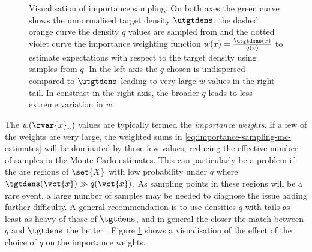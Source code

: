 \begin{figure}[t]
\begin{subfigure}[b]{.48\linewidth}
\end{subfigure}
\caption[Visualisation of importance sampling.]{Visualisation of importance sampling. On both axes the green curve shows the unnormalised target density $\utgtdens$, the dashed orange curve the density $q$ values are sampled from and the dotted violet curve the importance weighting function $w(x) = \frac{\utgtdens(x)}{q(x)}$ to estimate expectations with respect to the target density using samples from $q$. In the left axis the $q$ chosen is undispersed compared to $\utgtdens$ leading to very large $w$ values in the right tail. In constrast in the right axis, the broader $q$ leads to less extreme variation in $w$.}
\label{fig:importance-sampling}
\end{figure}

The $w(\rvar{x}_n)$ values are typically termed the \emph{importance weights}. If a few of the weights are very large, the weighted sums in \eqref{eq:importance-sampling-mc-estimates} will be dominated by those few values, reducing the effective number of samples in the Monte Carlo estimates. This can particularly be a problem if the are regions of $\set{X}$ with low probability under $q$ where $\tgtdens(\vct{x}) \gg q(\vct{x})$. As sampling points in these regions will be a rare event, a large number of samples may be needed to diagnose the issue adding further difficulty. A general recommendation is to use densities $q$ with tails as least as heavy of those of $\tgtdens$, and in general the closer the match between $q$ and $\tgtdens$ the better \citep{mackay2003information,owen2013importance}. Figure \ref{fig:importance-sampling} shows a visualisation of the effect of the choice of $q$ on the importance weights.

